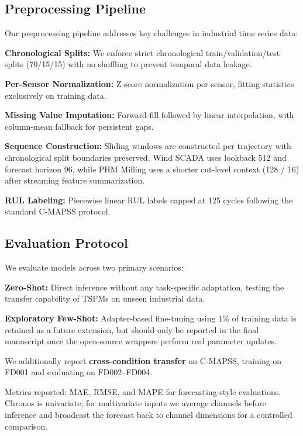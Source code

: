 \subsection{Preprocessing Pipeline}

Our preprocessing pipeline addresses key challenges in industrial time series data:

\textbf{Chronological Splits:} We enforce strict chronological train/validation/test splits (70/15/15) with no shuffling to prevent temporal data leakage.

\textbf{Per-Sensor Normalization:} Z-score normalization per sensor, fitting statistics exclusively on training data.

\textbf{Missing Value Imputation:} Forward-fill followed by linear interpolation, with column-mean fallback for persistent gaps.

\textbf{Sequence Construction:} Sliding windows are constructed per trajectory with chronological split boundaries preserved. Wind SCADA uses lookback 512 and forecast horizon 96, while PHM Milling uses a shorter cut-level context (128 / 16) after streaming feature summarization.

\textbf{RUL Labeling:} Piecewise linear RUL labels capped at 125 cycles following the standard C-MAPSS protocol.

\subsection{Evaluation Protocol}

We evaluate models across two primary scenarios:

\textbf{Zero-Shot:} Direct inference without any task-specific adaptation, testing the transfer capability of TSFMs on unseen industrial data.

\textbf{Exploratory Few-Shot:} Adapter-based fine-tuning using 1\% of training data is retained as a future extension, but should only be reported in the final manuscript once the open-source wrappers perform real parameter updates.

We additionally report \textbf{cross-condition transfer} on C-MAPSS, training on FD001 and evaluating on FD002--FD004.

Metrics reported: MAE, RMSE, and MAPE for forecasting-style evaluations. Chronos is univariate; for multivariate inputs we average channels before inference and broadcast the forecast back to channel dimensions for a controlled comparison.
